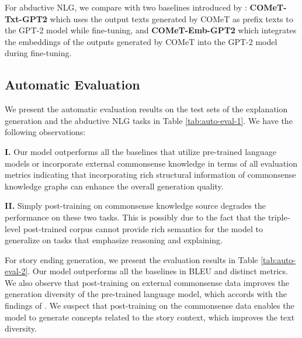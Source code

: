 \documentclass[11pt,a4paper]{article}
\begin{document}
For abductive NLG, we compare with two baselines introduced by \citet{Bhagavatula2019AbductiveCR}: \textbf{COMeT-Txt-GPT2} which uses the output texts generated by COMeT as prefix texts to the GPT-2 model while fine-tuning, and \textbf{COMeT-Emb-GPT2} which integrates the embeddings of the outputs generated by COMeT into the GPT-2 model during fine-tuning.


\subsection{Automatic Evaluation}
We present the automatic evaluation results on the test sets of the explanation generation and the abductive NLG tasks in Table \ref{tab:auto-eval-1}. We have the following observations:

\textbf{I.} Our model outperforms all the baselines that utilize pre-trained language models or incorporate external commonsense knowledge in terms of all evaluation metrics indicating that incorporating rich structural information of commonsense knowledge graphs can enhance the overall generation quality.

\textbf{II.} Simply post-training on commonsense knowledge source degrades the performance on these two tasks. This is possibly due to the fact that the triple-level post-trained corpus cannot provide rich semantics for the model to generalize on tasks that emphasize reasoning and explaining.


For story ending generation, we present the evaluation results in Table \ref{tab:auto-eval-2}. Our model outperforms all the baselines in BLEU and distinct metrics. We also observe that post-training on external commonsense data improves the generation diversity of the pre-trained language model, which accords with the findings of \citet{guan2020knowledge}. We suspect that post-training on the commonsense data enables the model to generate concepts related to the story context, which improves the text diversity.
\end{document}
